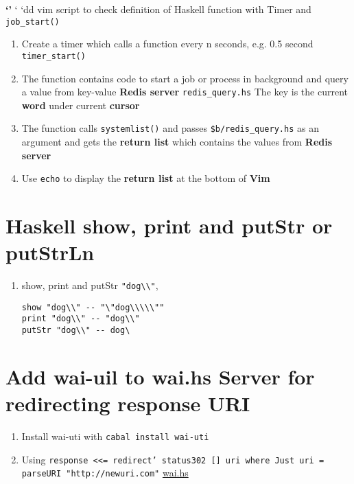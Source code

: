 \documentclass[11pt]{article}
\begin{document}
\textbf{`'}  ` `dd vim script to check definition of Haskell function with Timer and \texttt{job\_start()}
\begin{enumerate}
\item Create a timer which calls a function every n seconds, e.g. 0.5 second \texttt{timer\_start()}
\item The function contains code to start a job or process in background and query a value from key-value \textbf{Redis server} \texttt{redis\_query.hs}
The key is the current \textbf{word} under current \textbf{cursor}
\item The function calls \texttt{systemlist()} and passes \texttt{\$b/redis\_query.hs} as an argument and gets the \textbf{return list} which contains the values from \textbf{Redis server}
\item Use \texttt{echo} to display the \textbf{return list} at the bottom of \textbf{Vim}
\end{enumerate}

\section{Haskell show, print and putStr or putStrLn}
\label{sec:orgdfb1d1a}
\begin{enumerate}
\item show, print and putStr \texttt{"dog\textbackslash{}\textbackslash{}"},
\begin{verbatim}
show "dog\\" -- "\"dog\\\\\""
print "dog\\" -- "dog\\"
putStr "dog\\" -- dog\
\end{verbatim}
\end{enumerate}
\section{Add wai-uil to wai.hs Server for redirecting response URI}
\label{sec:orgabd8723}
\begin{enumerate}
\item Install wai-uti with \texttt{cabal install wai-uti}
\item Using \texttt{response <<= redirect' status302 [] uri where Just uri = parseURI "http://newuri.com"}
\href{https://bitbucket.org/zsurface/haskell\_webapp/src/master/wai.hs}{wai.hs}
\end{enumerate}
\end{document}
